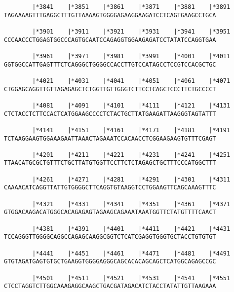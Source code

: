 \documentclass{article}
\begin{document}
\begin{Verbatim}
        |*3841    |*3851    |*3861    |*3871    |*3881    |*3891
TAGAAAAGTTTGAGGCTTTGTTAAAAGTGGGGAGAAGGAAGATCCTCAGTGAAGCCTGCA
                                                            
        |*3901    |*3911    |*3921    |*3931    |*3941    |*3951
CCCAACCCTGGAGTGGCCCAGTGCAATCCAGAGGTGGAAGAGATCCTATATCCAGGTGAA
                                                            
        |*3961    |*3971    |*3981    |*3991    |*4001    |*4011
GGTGGCCATTGAGTTTCTCAGGGCTGGGGCCACCTTGTCCATAGCCTCCGTCCACGCTGC
                                                            
        |*4021    |*4031    |*4041    |*4051    |*4061    |*4071
CTGGAGCAGGTTGTTAGAGAGCTCTGGTTGTTGGGTCTTCCTCAGCTCCCTTCTGCCCCT
                                                            
        |*4081    |*4091    |*4101    |*4111    |*4121    |*4131
CTCTACCTCTTCCACTCATGGAAGCCCCTCTACTGCTTATGAAGATTAAGGGTAGTATTT
                                                            
        |*4141    |*4151    |*4161    |*4171    |*4181    |*4191
TCTAAGGAAGTGGAAAGAATTAAACTAGAAATCCACAACCTCGGAAGAAGTGTTTCGAGT
                                                            
        |*4201    |*4211    |*4221    |*4231    |*4241    |*4251
TTAACATGCGCTGTTTCTGCTTATGTGGTTCCTTCTCTAGAGCTGCTTTCCCATGGCTTT
                                                            
        |*4261    |*4271    |*4281    |*4291    |*4301    |*4311
CAAAACATCAGGTTATTGTGGGGCTTCAGGTGTAAGGTCCTGGAAGTTCAGCAAAGTTTC
                                                            
        |*4321    |*4331    |*4341    |*4351    |*4361    |*4371
GTGGACAAGACATGGGCACAGAGAGTAGAAGCAGAAATAAATGGTTCTATGTTTTCAACT
                                                            
        |*4381    |*4391    |*4401    |*4411    |*4421    |*4431
TCCAGGGTTGGGGCAGGCCAGAGCAAGGCGGTCTCATCGAGGTGGGTGCTACCTGTGTGT
                                                            
        |*4441    |*4451    |*4461    |*4471    |*4481    |*4491
GTGTAGATGAGTGTGCTGAAGGTGGGGAGGGCAGCACACAGCAGCTCATGGCAGAGCCGC
                                                            
        |*4501    |*4511    |*4521    |*4531    |*4541    |*4551
CTCCTAGGTCTTGGCAAAGAGGCAAGCTGACGATAGACATCTACCTATATTGTTAAGAAA
                                                            

\end{Verbatim}
\end{document}
